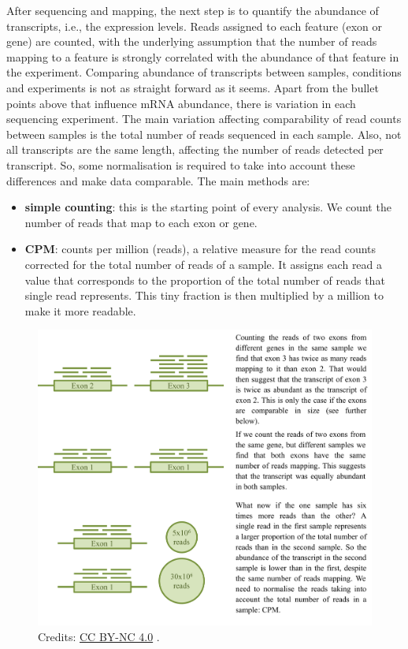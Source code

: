 After sequencing and mapping, the next step is to quantify the abundance of
transcripts, i.e., the expression levels. Reads assigned to each feature
(exon or gene) are counted, with the underlying assumption that the number
of reads mapping to a feature is strongly correlated with the abundance of
that feature in the experiment. Comparing abundance of transcripts between
samples, conditions and experiments is not as straight forward as it seems.
Apart from the bullet points above that influence mRNA abundance, there is
variation in each sequencing experiment. The main variation affecting
comparability of read counts between samples is the total number of reads
sequenced in each sample. Also, not all transcripts are the same length,
affecting the number of reads detected per transcript. So, some
normalisation is required to take into account these differences and make
data comparable. The main methods are:

\begin{itemize}
\item \textbf{simple counting}: this is the starting point of every analysis.  We
count the number of reads that map to each exon or gene.


\item \textbf{CPM}: counts per million (reads), a relative measure for
the read counts corrected for the total number of reads of a sample.  It
assigns each read a value that corresponds to the proportion of the total
number of reads that single read represents.  This tiny fraction is then
multiplied by a million to make it more readable.
\end{itemize}

\begin{figure}[!htbp]
\centering
\includegraphics[width=0.7\linewidth]{files/CPM-3324f95a431c80e84eb69a0ecd2711f8.pdf}
\caption[]{Credits: \href{https://creativecommons.org/licenses/by-nc/4.0/}{CC BY-NC 4.0} \cite{own_5_2024}.}
\label{CPM}
\end{figure}

